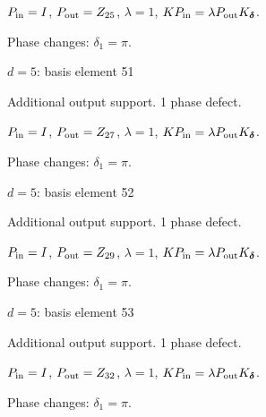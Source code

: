 \vspace{-1mm}
$P_{\rm in}=I$, \quad $P_{\rm out}=Z_{25}$, \quad $\lambda=1$, \qquad $K P_{\rm in}=\lambda P_{\rm out}K_{\boldsymbol\delta}$.
\par\smallskip\begin{minipage}{.98\linewidth}\small Phase changes: $\delta_{1}=\pi$.\end{minipage}
\vfill
{\footnotesize\texttt{}}
\newpage
{}
{\Large $d=5$: basis element 51}\par
Additional output support. 1 phase defect.
\begin{center}
\end{center}
\vspace{-1mm}
$P_{\rm in}=I$, \quad $P_{\rm out}=Z_{27}$, \quad $\lambda=1$, \qquad $K P_{\rm in}=\lambda P_{\rm out}K_{\boldsymbol\delta}$.
\par\smallskip\begin{minipage}{.98\linewidth}\small Phase changes: $\delta_{1}=\pi$.\end{minipage}
\vfill
{\footnotesize\texttt{}}
\newpage
{}
{\Large $d=5$: basis element 52}\par
Additional output support. 1 phase defect.
\begin{center}
\end{center}
\vspace{-1mm}
$P_{\rm in}=I$, \quad $P_{\rm out}=Z_{29}$, \quad $\lambda=1$, \qquad $K P_{\rm in}=\lambda P_{\rm out}K_{\boldsymbol\delta}$.
\par\smallskip\begin{minipage}{.98\linewidth}\small Phase changes: $\delta_{1}=\pi$.\end{minipage}
\vfill
{\footnotesize\texttt{}}
\newpage
{}
{\Large $d=5$: basis element 53}\par
Additional output support. 1 phase defect.
\begin{center}
\end{center}
\vspace{-1mm}
$P_{\rm in}=I$, \quad $P_{\rm out}=Z_{32}$, \quad $\lambda=1$, \qquad $K P_{\rm in}=\lambda P_{\rm out}K_{\boldsymbol\delta}$.
\par\smallskip\begin{minipage}{.98\linewidth}\small Phase changes: $\delta_{1}=\pi$.\end{minipage}
